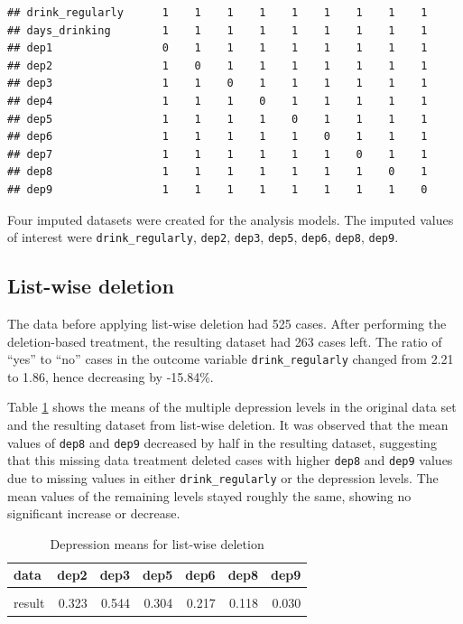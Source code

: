 \documentclass[
]{article}
\begin{document}
\begin{verbatim}
## drink_regularly      1    1    1    1    1    1    1    1    1
## days_drinking        1    1    1    1    1    1    1    1    1
## dep1                 0    1    1    1    1    1    1    1    1
## dep2                 1    0    1    1    1    1    1    1    1
## dep3                 1    1    0    1    1    1    1    1    1
## dep4                 1    1    1    0    1    1    1    1    1
## dep5                 1    1    1    1    0    1    1    1    1
## dep6                 1    1    1    1    1    0    1    1    1
## dep7                 1    1    1    1    1    1    0    1    1
## dep8                 1    1    1    1    1    1    1    0    1
## dep9                 1    1    1    1    1    1    1    1    0
\end{verbatim}

Four imputed datasets were created for the analysis models. The imputed values of interest were \texttt{drink\_regularly}, \texttt{dep2}, \texttt{dep3}, \texttt{dep5}, \texttt{dep6}, \texttt{dep8}, \texttt{dep9}.

\hypertarget{lw}{%
\subsection{List-wise deletion}\label{lw}}

The data before applying list-wise deletion had 525 cases. After performing the deletion-based treatment, the resulting dataset had 263 cases left. The ratio of ``yes'' to ``no'' cases in the outcome variable \texttt{drink\_regularly} changed from 2.21 to 1.86, hence decreasing by -15.84\%.

Table \ref{tab:dep-means-lw} shows the means of the multiple depression levels in the original data set and the resulting dataset from list-wise deletion. It was observed that the mean values of \texttt{dep8} and \texttt{dep9} decreased by half in the resulting dataset, suggesting that this missing data treatment deleted cases with higher \texttt{dep8} and \texttt{dep9} values due to missing values in either \texttt{drink\_regularly} or the depression levels. The mean values of the remaining levels stayed roughly the same, showing no significant increase or decrease.

\begin{table}[!h]

\caption{\label{tab:dep-means-lw}Depression means for list-wise deletion}
\centering
\begin{tabular}[t]{lrrrrrr}
\toprule
data & dep2 & dep3 & dep5 & dep6 & dep8 & dep9\\
\midrule
\cellcolor{gray!6}{original} & \cellcolor{gray!6}{0.282} & \cellcolor{gray!6}{0.533} & \cellcolor{gray!6}{0.310} & \cellcolor{gray!6}{0.201} & \cellcolor{gray!6}{0.203} & \cellcolor{gray!6}{0.067}\\
result & 0.323 & 0.544 & 0.304 & 0.217 & 0.118 & 0.030\\
\bottomrule
\end{tabular}
\end{table}
\end{document}
